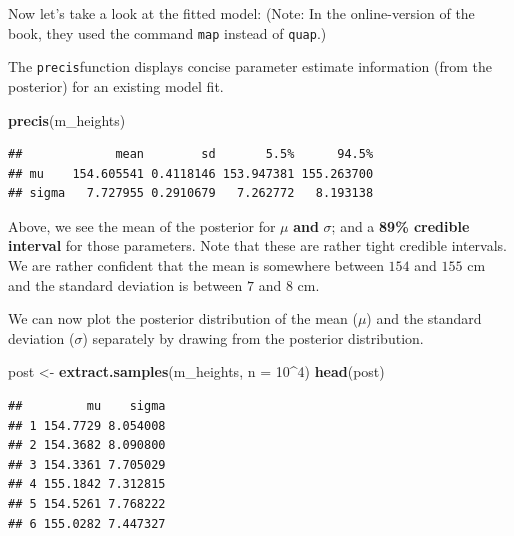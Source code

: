 \documentclass[
]{book}
\newenvironment{Shaded}{\begin{snugshade}}{\end{snugshade}}
\newcommand{\AttributeTok}[1]{\textcolor[rgb]{0.13,0.29,0.53}{#1}}
\newcommand{\DecValTok}[1]{\textcolor[rgb]{0.00,0.00,0.81}{#1}}
\newcommand{\FunctionTok}[1]{\textcolor[rgb]{0.13,0.29,0.53}{\textbf{#1}}}
\newcommand{\NormalTok}[1]{#1}
\newcommand{\OtherTok}[1]{\textcolor[rgb]{0.56,0.35,0.01}{#1}}
\newcommand{\SpecialCharTok}[1]{\textcolor[rgb]{0.81,0.36,0.00}{\textbf{#1}}}
\begin{document}
Now let's take a look at the fitted model:
(Note: In the online-version of the book, they used the command \texttt{map} instead of \texttt{quap}.)

The \texttt{precis}function displays concise parameter estimate information
(from the posterior) for an existing model fit.

\begin{Shaded}
\begin{Highlighting}[]
\FunctionTok{precis}\NormalTok{(m\_heights)}
\end{Highlighting}
\end{Shaded}

\begin{verbatim}
##             mean        sd       5.5%      94.5%
## mu    154.605541 0.4118146 153.947381 155.263700
## sigma   7.727955 0.2910679   7.262772   8.193138
\end{verbatim}

Above, we see the mean of the posterior for \(\mu\) \textbf{and} \(\sigma\);
and a \textbf{89\% credible interval} for those parameters.
Note that these are rather tight credible intervals. We are rather confident that the mean is somewhere between
\(154\) and \(155\) cm and the standard deviation is between \(7\) and \(8\) cm.

We can now plot the posterior distribution of the mean (\(\mu\)) and the standard
deviation (\(\sigma\)) separately by drawing from the posterior distribution.

\begin{Shaded}
\begin{Highlighting}[]
\NormalTok{post }\OtherTok{\textless{}{-}} \FunctionTok{extract.samples}\NormalTok{(m\_heights, }\AttributeTok{n =} \DecValTok{10}\SpecialCharTok{\^{}}\DecValTok{4}\NormalTok{)}
\FunctionTok{head}\NormalTok{(post)}
\end{Highlighting}
\end{Shaded}

\begin{verbatim}
##         mu    sigma
## 1 154.7729 8.054008
## 2 154.3682 8.090800
## 3 154.3361 7.705029
## 4 155.1842 7.312815
## 5 154.5261 7.768222
## 6 155.0282 7.447327
\end{verbatim}

\begin{Shaded}
\end{Shaded}
\end{document}
